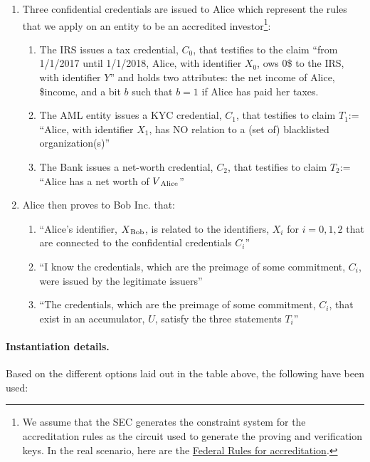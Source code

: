 \begin{enumerate}
\item Three confidential credentials are issued to Alice which represent the rules that we apply on an entity to be an accredited investor\footnote{We assume that the SEC generates the constraint system for the accreditation rules as the circuit used to generate the proving and verification keys. In the real scenario, here are the \href{https://www.ecfr.gov/cgi-bin/retrieveECFR?gp=&SID=8edfd12967d69c024485029d968ee737&r=SECTION&n=17y3.0.1.1.12.0.46.176}{Federal Rules for accreditation}.}:
		\begin{enumerate}
        \item The IRS issues a tax credential, $C_0$, that testifies to the claim “from 1/1/2017 until 1/1/2018, Alice, with identifier $X_0$, ows 0\$ to the IRS, with identifier $Y$” and holds two attributes: the net income of Alice, \$income, and a bit $b$ such that $b=1$ if Alice has paid her taxes.
        \item The AML entity issues a KYC credential, $C_1$, that testifies to claim $T_1$:= “Alice, with identifier $X_1$, has NO relation to a (set of) blacklisted organization(s)”
        \item The Bank issues a net-worth credential, $C_2$, that testifies to claim $T_2$:= “Alice has a net worth of $V\textsubscript{Alice}$”
		\end{enumerate}
\item Alice then proves to Bob Inc. that:
    \begin{enumerate}
				\item “Alice’s identifier, $X\textsubscript{Bob}$, is related to the identifiers, {$X_i$} for $i = 0, 1, 2$ that are connected to the confidential credentials {$C_i$}”
        \item “I know the credentials, which are the preimage of some commitment, {$C_i$}, were issued by the legitimate issuers”
        \item “The credentials, which are the preimage of some commitment, {$C_i$}, that exist in an accumulator, $U$, satisfy the three statements {$T_i$}”
		\end{enumerate}
\end{enumerate}



\paragraph{Instantiation details.}
Based on the different options laid out in the table above, the following have been used:


